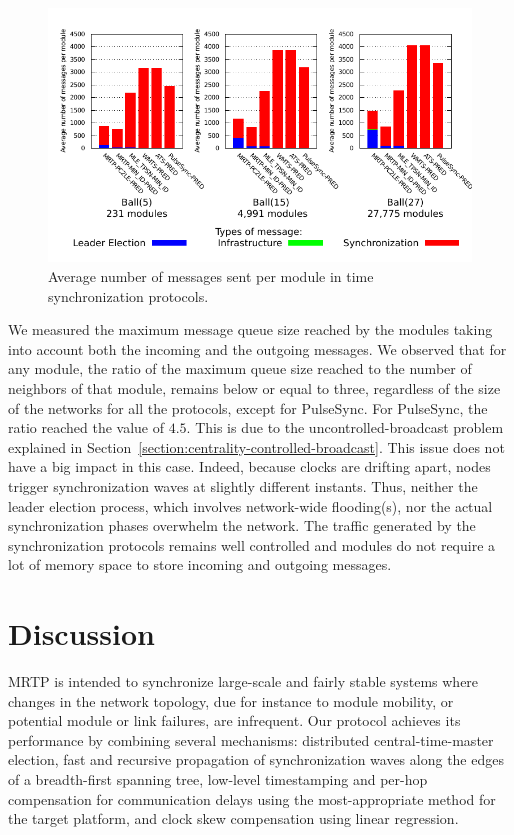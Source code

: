 \begin{figure}[h!]
	\centering
	\includegraphics[width=1.0\linewidth]{images/time-synchronization/messages}
	\caption{Average number of messages sent per module in time synchronization protocols.}
	\label{fig:time-sync:messages}
\end{figure}

We measured the maximum message queue size reached by the modules taking into account both the incoming and the outgoing messages. We observed that for any module, the ratio of the maximum queue size reached to the number of neighbors of that module, remains below or equal to three, regardless of the size of the networks for all the protocols, except for PulseSync. For PulseSync, the ratio reached the value of $4.5$. This is due to the uncontrolled-broadcast problem explained in Section~\ref{section:centrality-controlled-broadcast}. This issue does not have a big impact in this case. Indeed, because clocks are drifting apart, nodes trigger synchronization waves at slightly different instants. Thus, neither the leader election process, which involves network-wide flooding(s), nor the actual synchronization phases overwhelm the network. The traffic generated by the synchronization protocols remains well controlled and modules do not require a lot of memory space to store incoming and outgoing messages.

\section{Discussion}

MRTP is intended to synchronize large-scale and fairly stable systems where changes in the network topology, due for instance to module mobility, or potential module or link failures, are infrequent. Our protocol achieves its performance by combining several mechanisms: distributed central-time-master election, fast and recursive propagation of synchronization waves along the edges of a breadth-first spanning tree, low-level timestamping and per-hop compensation for communication delays using the most-appropriate method for the target platform, and clock skew compensation using linear regression.


